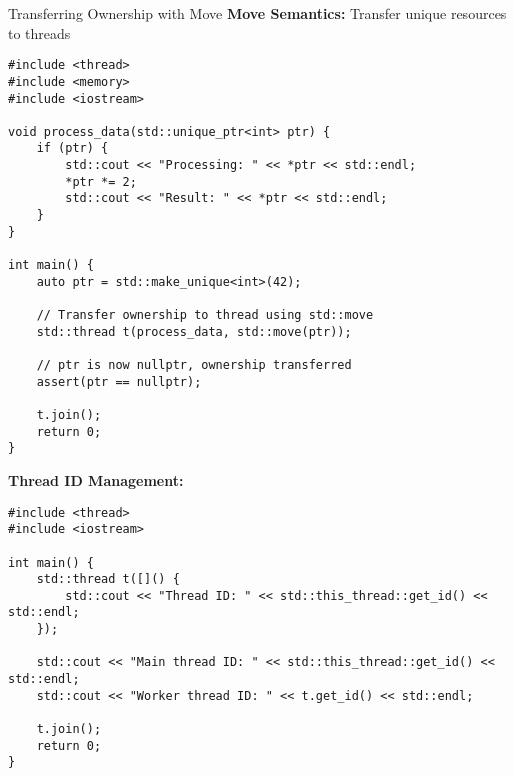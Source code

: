 \begin{frame}[fragile]{ Transferring Ownership with Move}
	\textbf{Move Semantics:} Transfer unique resources to threads

	\begin{verbatim}
#include <thread>
#include <memory>
#include <iostream>

void process_data(std::unique_ptr<int> ptr) {
    if (ptr) {
        std::cout << "Processing: " << *ptr << std::endl;
        *ptr *= 2;
        std::cout << "Result: " << *ptr << std::endl;
    }
}

int main() {
    auto ptr = std::make_unique<int>(42);

    // Transfer ownership to thread using std::move
    std::thread t(process_data, std::move(ptr));

    // ptr is now nullptr, ownership transferred
    assert(ptr == nullptr);

    t.join();
    return 0;
}
	\end{verbatim}

	\vspace{1em}
	\textbf{Thread ID Management:}
	\begin{verbatim}
#include <thread>
#include <iostream>

int main() {
    std::thread t([]() {
        std::cout << "Thread ID: " << std::this_thread::get_id() << std::endl;
    });

    std::cout << "Main thread ID: " << std::this_thread::get_id() << std::endl;
    std::cout << "Worker thread ID: " << t.get_id() << std::endl;

    t.join();
    return 0;
}
	\end{verbatim}
\end{frame}


